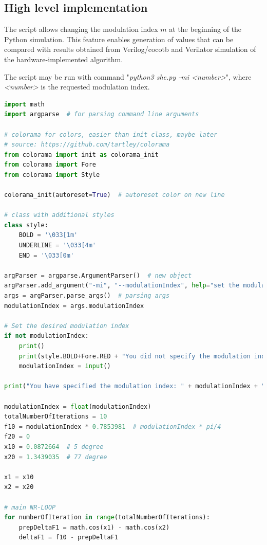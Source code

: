 \documentclass[a4paper, twoside, 11pt]{article}
\begin{document}
    \subsection{High level implementation}
    The script allows changing the modulation index $m$ at the beginning of the Python simulation. This feature enables generation of values that can be compared with results obtained from Verilog/cocotb and Verilator simulation of the hardware-implemented algorithm.\par
    The script may be run with command "\textit{python3 she.py -mi <number>}", where \textit{<number>} is the requested modulation index.
\begin{lstlisting}[language={python}, caption={Python implementation of the Selective Harmonic Elimination Algorithm with adjustable modulation index.}, label= {lst:she-python}]
import math
import argparse  # for parsing command line arguments

# colorama for colors, easier than init class, maybe later
# source: https://github.com/tartley/colorama
from colorama import init as colorama_init
from colorama import Fore
from colorama import Style

colorama_init(autoreset=True)  # autoreset color on new line

# class with additional styles
class style:
    BOLD = '\033[1m'
    UNDERLINE = '\033[4m'
    END = '\033[0m'

argParser = argparse.ArgumentParser()  # new object
argParser.add_argument("-mi", "--modulationIndex", help="set the modulation index 0-1") # adding argument
args = argParser.parse_args()  # parsing args
modulationIndex = args.modulationIndex

# Set the desired modulation index
if not modulationIndex:
    print()
    print(style.BOLD+Fore.RED + "You did not specify the modulation index with mi command, specify it now:\n" + style.END)
    modulationIndex = input()

print("You have specified the modulation index: " + modulationIndex + ".\n")

modulationIndex = float(modulationIndex)
totalNumberOfIterations = 10
f10 = modulationIndex * 0.7853981  # modulationIndex * pi/4
f20 = 0
x10 = 0.0872664  # 5 degree
x20 = 1.3439035  # 77 degree

x1 = x10
x2 = x20

# main NR-LOOP
for numberOfIteration in range(totalNumberOfIterations):
    prepDeltaF1 = math.cos(x1) - math.cos(x2)
    deltaF1 = f10 - prepDeltaF1


\end{lstlisting}
\end{document}
